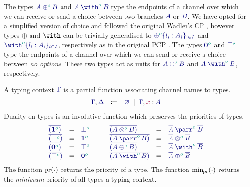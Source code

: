 \documentclass[main.tex]{subfiles}
\begin{document}
The types $\ty{\typlus[\cs{o}]{A}{B}}$ and $\ty{\tywith[\cs{o}]{A}{B}}$ type the endpoints of a channel over which we can receive or send a choice between two branches $\ty{A}$ or $\ty{B}$. We have opted for a simplified version of choice and followed the original Wadler's CP \cite{wadler12}, however types $\oplus$ and $\with$ can be trivially generalised to $\ty{\oplus^{\cs{o}}\{l_i:A_i\}_{i\in I}}$ and $\ty{\with^{\cs{o}}\{l_i:A_i\}_{i\in I}}$, respectively as in the original PCP \cite{dardhagay18}.
The types $\ty{\tynil[\cs{o}]}$ and $\ty{\tytop[\cs{o}]}$ type the endpoints of a channel over which we can send or receive a choice between \emph{no options}. These two types act as units for $\ty{\typlus[\cs{o}]{A}{B}}$ and $\ty{\tywith[\cs{o}]{A}{B}}$, respectively.

A typing context $\ty\Gamma$ is a partial function associating channel names to types.
\[
\begin{array}{lcl}
  \ty{\Gamma}, \ty{\Delta}
  & \coloneqq & \ty{\emptyenv}
    \sep        \ty{\Gamma}, \tmty{x}{A}
\end{array}
\]
Duality on types is an involutive function which preserves the priorities of types.
\[
\begin{array}{lcl}
  \ty{\co{(\tyone[\cs{o}])}} & = & \ty{\tybot[\cs{o}]} \\
  \ty{\co{(\tybot[\cs{o}])}} & = & \ty{\tyone[\cs{o}]} \\
  \ty{\co{(\tynil[\cs{o}])}} & = & \ty{\tytop[\cs{o}]} \\
  \ty{\co{(\tytop[\cs{o}])}} & = & \ty{\tynil[\cs{o}]}
\end{array}
\qquad
\begin{array}{lcl}
  \ty{\co{(\tytens[\cs{o}]{A}{B})}} & = & \ty{\typarr[\cs{o}]{\co{A}}{\co{B}}} \\
  \ty{\co{(\typarr[\cs{o}]{A}{B})}} & = & \ty{\tytens[\cs{o}]{\co{A}}{\co{B}}} \\
  \ty{\co{(\typlus[\cs{o}]{A}{B})}} & = & \ty{\tywith[\cs{o}]{\co{A}}{\co{B}}} \\
  \ty{\co{(\tywith[\cs{o}]{A}{B})}} & = & \ty{\typlus[\cs{o}]{\co{A}}{\co{B}}}
\end{array}
\]
The function $\operatorname{pr}(\cdot)$ returns the priority of a type. The function $\text{min}_{\operatorname{pr}}(\cdot)$ returns the \emph{minimum} priority of all types a typing context.
\end{document}

